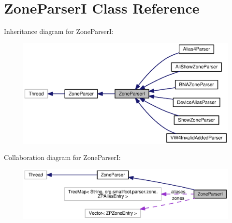 \section{Zone\+Parser\+I Class Reference}
\label{classorg_1_1smallfoot_1_1parser_1_1zone_1_1ZoneParserI}


Inheritance diagram for Zone\+Parser\+I\+:\nopagebreak
\begin{figure}[H]
\begin{center}
\leavevmode
\includegraphics[width=350pt]{classorg_1_1smallfoot_1_1parser_1_1zone_1_1ZoneParserI__inherit__graph}
\end{center}
\end{figure}


Collaboration diagram for Zone\+Parser\+I\+:\nopagebreak
\begin{figure}[H]
\begin{center}
\leavevmode
\includegraphics[width=350pt]{classorg_1_1smallfoot_1_1parser_1_1zone_1_1ZoneParserI__coll__graph}
\end{center}
\end{figure}
